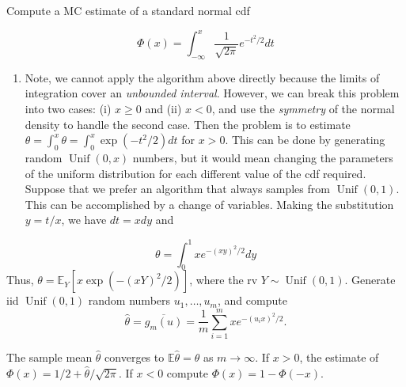\documentclass[
  letterpaper,
  DIV=11,
  numbers=noendperiod]{scrreprt}
\providecommand{\tightlist}{%
  \setlength{\itemsep}{0pt}\setlength{\parskip}{0pt}}
\begin{document}
Compute a MC estimate of a standard normal cdf

\[
\Phi(x)=\int_{-\infty}^x \frac{1}{\sqrt{2 \pi}} e^{-t^2 / 2} d t
\]

\begin{enumerate}
\def\labelenumi{\arabic{enumi}.}
\tightlist
\item
  Note, we cannot apply the algorithm above directly because the limits
  of integration cover an \emph{unbounded interval}. However, we can
  break this problem into two cases: (i) \(x \ge 0\) and (ii) \(x < 0\),
  and use the \emph{symmetry} of the normal density to handle the second
  case. Then the problem is to estimate
  \(\theta =\int_0^x \theta = \int_0^x \exp(−t^2/2) dt\) for \(x > 0\).
  This can be done by generating random \(\operatorname{Unif}(0,x)\)
  numbers, but it would mean changing the parameters of the uniform
  distribution for each different value of the cdf required. Suppose
  that we prefer an algorithm that always samples from
  \(\operatorname{Unif}(0,1)\). This can be accomplished by a change of
  variables. Making the substitution \(y = t/x\), we have \(dt = x dy\)
  and
\end{enumerate}

\[
\theta=\int_0^1 x e^{-(x y)^2 / 2} d y
\] Thus, \(\theta = \mathbb{E}_Y[x\exp(-(xY)^2/2)]\), where the rv
\(Y\sim \operatorname{Unif}(0,1)\). Generate iid
\(\operatorname{Unif}(0,1)\) random numbers \(u_1,\dots,u_m\), and
compute
\[\hat{\theta}=\overline{g_m(u)}=\frac{1}{m} \sum_{i=1}^m x e^{-\left(u_i x\right)^2 / 2}.
\]

The sample mean \(\hat{\theta}\) converges to
\(\mathbb{E}\hat{\theta}= \theta\) as \(m\to \infty\). If \(x > 0\), the
estimate of \(\Phi(x) = 1/2 + \hat{\theta}/\sqrt{2\pi}\). If \(x < 0\)
compute \(\Phi(x) = 1 − \Phi(−x)\).
\end{document}
